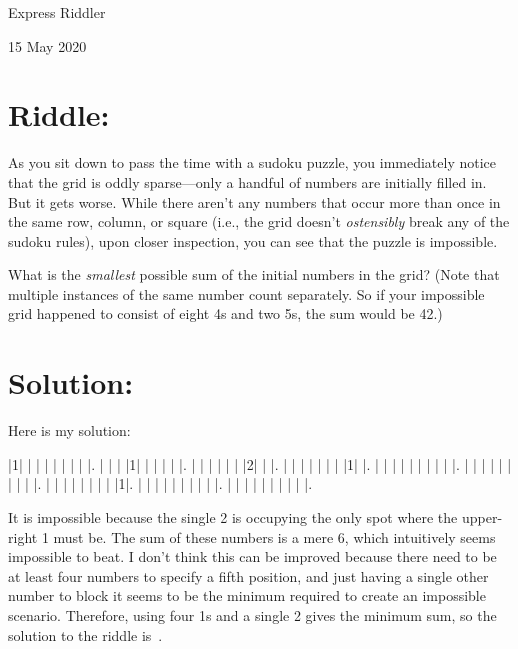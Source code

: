 \documentclass{article}
\begin{document}
\pagestyle{empty} %

\begin{center}
{\LARGE Express Riddler}

\vspace{0.15in}

{\Large 15 May 2020}
\end{center}


\section*{Riddle:}

As you sit down to pass the time with a sudoku puzzle, you immediately notice that the grid is oddly sparse---only a handful of numbers are initially filled in.
But it gets worse.
While there aren't any numbers that occur more than once in the same row, column, or square (i.e., the grid doesn't \textit{ostensibly} break any of the sudoku rules), upon closer inspection, you can see that the puzzle is impossible.

What is the \textit{smallest} possible sum of the initial numbers in the grid?
(Note that multiple instances of the same number count separately.
So if your impossible grid happened to consist of eight 4s and two 5s, the sum would be 42.)

\section*{Solution:}

Here is my solution:

\vspace{0.1in}
\begin{sudoku}
|1| | | | | | | | |.
| | | |1| | | | | |.
| | | | | | |2| | |.
| | | | | | | |1| |.
| | | | | | | | | |.
| | | | | | | | | |.
| | | | | | | | |1|.
| | | | | | | | | |.
| | | | | | | | | |.
\end{sudoku}
\vspace{0.1in}

It is impossible because the single 2 is occupying the only spot where the upper-right 1 must be.
The sum of these numbers is a mere 6, which intuitively seems impossible to beat.
I don't think this can be improved because there need to be at least four numbers to specify a fifth position, and just having a single other number to block it seems to be the minimum required to create an impossible  scenario.
Therefore, using four 1s and a single 2 gives the minimum sum, so the solution to the riddle is
\,.
\end{document}
